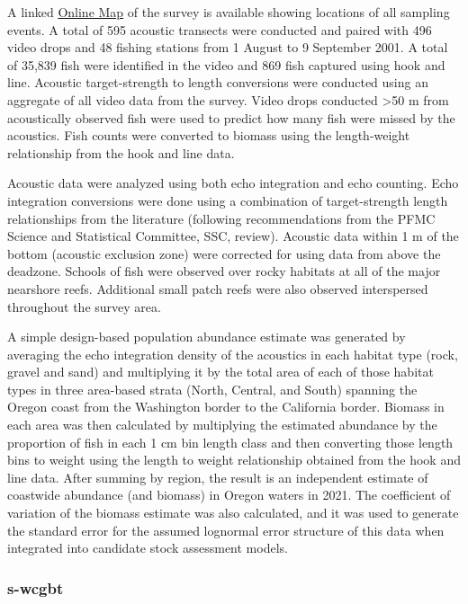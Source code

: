 \documentclass[11pt,
  english,
  letterpaper,
]{article}
\begin{document}
A linked \href{https://www.arcgis.com/apps/mapviewer/index.html?webmap=49e8f3a8079448c29a21d4384d2b50dd}{Online Map} of the survey is available showing locations of all sampling events. A total of 595 acoustic transects were conducted and paired with 496 video drops and 48 fishing stations from 1 August to 9 September 2001. A total of 35,839 fish were identified in the video and 869 fish captured using hook and line. Acoustic target-strength to length conversions were conducted using an aggregate of all video data from the survey. Video drops conducted \textgreater50 m from acoustically observed fish were used to predict how many fish were missed by the acoustics. Fish counts were converted to biomass using the length-weight relationship from the hook and line data.

Acoustic data were analyzed using both echo integration and echo counting. Echo integration conversions were done using a combination of target-strength length relationships from the literature (following recommendations from the PFMC Science and Statistical Committee, SSC, review). Acoustic data within 1 m of the bottom (acoustic exclusion zone) were corrected for using data from above the deadzone. Schools of fish were observed over rocky habitats at all of the major nearshore reefs. Additional small patch reefs were also observed interspersed throughout the survey area.

A simple design-based population abundance estimate was generated by averaging the echo integration density of the acoustics in each habitat type (rock, gravel and sand) and multiplying it by the total area of each of those habitat types in three area-based strata (North, Central, and South) spanning the Oregon coast from the Washington border to the California border. Biomass in each area was then calculated by multiplying the estimated abundance by the proportion of fish in each 1 cm bin length class and then converting those length bins to weight using the length to weight relationship obtained from the hook and line data. After summing by region, the result is an independent estimate of coastwide abundance (and biomass) in Oregon waters in 2021. The coefficient of variation of the biomass estimate was also calculated, and it was used to generate the standard error for the assumed lognormal error structure of this data when integrated into candidate stock assessment models.

\hypertarget{section}{%
\subsubsection{\texorpdfstring{\acrlong{s-wcgbt}}{}}\label{section}}
\end{document}

